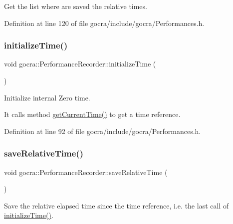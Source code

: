 Get the list where are saved the relative times. 

Definition at line 120 of file gocra/include/gocra/\+Performances.\+h.

\hypertarget{classgocra_1_1PerformanceRecorder_ac0a5ac7aa54b9abc0a4c25cd291dbee9}{}\label{classgocra_1_1PerformanceRecorder_ac0a5ac7aa54b9abc0a4c25cd291dbee9} 
\subsubsection{\texorpdfstring{initialize\+Time()}{initializeTime()}}
{\footnotesize\ttfamily void gocra\+::\+Performance\+Recorder\+::initialize\+Time (\begin{DoxyParamCaption}{ }\end{DoxyParamCaption})\hspace{0.3cm}{\ttfamily [inline]}}

Initialize internal Zero time.

It calls method \hyperlink{classgocra_1_1PerformanceRecorder_a96c4be3089ddcddeb69c2335108da0bf}{get\+Current\+Time()} to get a time reference. 

Definition at line 92 of file gocra/include/gocra/\+Performances.\+h.

\hypertarget{classgocra_1_1PerformanceRecorder_a7cfcd7b0e29626e2e2a14ad4ef3bf553}{}\label{classgocra_1_1PerformanceRecorder_a7cfcd7b0e29626e2e2a14ad4ef3bf553} 
\subsubsection{\texorpdfstring{save\+Relative\+Time()}{saveRelativeTime()}}
{\footnotesize\ttfamily void gocra\+::\+Performance\+Recorder\+::save\+Relative\+Time (\begin{DoxyParamCaption}{ }\end{DoxyParamCaption})\hspace{0.3cm}{\ttfamily [inline]}}

Save the relative elapsed time since the time reference, i.\+e. the last call of \hyperlink{classgocra_1_1PerformanceRecorder_ac0a5ac7aa54b9abc0a4c25cd291dbee9}{initialize\+Time()}.

